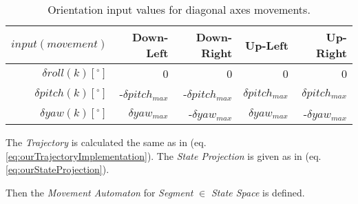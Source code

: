 \begin{table}[H]
    \centering
    \begin{tabular}{r||r|r|r|r}
        $input(movement)$             & Down-Left & Down-Right & Up-Left  & Up-Right   \\\hline\hline

        $\delta  roll(k) [^\circ]$	& 0	    & 0	    & 0    & 0     \\\hline
        $\delta pitch(k) [^\circ]$     & -$\delta pitch_{max}$ & -$\delta pitch_{max}$ & $\delta pitch_{max}$ & $\delta pitch_{max}$     \\\hline
        $\delta   yaw(k) [^\circ]$    & $\delta yaw_{max}$	& -$\delta yaw_{max}$	& $\delta yaw_{max}$ & -$\delta yaw_{max}$ \\
    \end{tabular}
    \caption{Orientation input values for diagonal axes movements.}
    \label{tab:movements4}
\end{table}

\begin{note}
    The \emph{Trajectory} is calculated the same as in (eq. \ref{eq:ourTrajectoryImplementation}). The \emph{State Projection} is given as in (eq. \ref{eq:ourStateProjection}).
\end{note}

\noindent Then the \emph{Movement Automaton} for \emph{Segment} $\in$ \emph{State Space} is defined.

